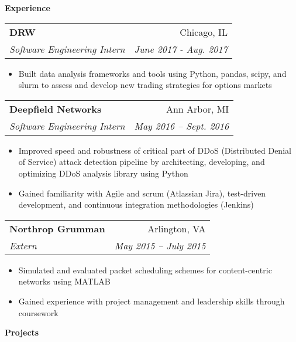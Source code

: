 \documentclass[letterpaper,11pt]{article}
\makeatletter
\newcommand{\resitem}[1]{\item #1 \vspace{-2pt}}
\newcommand{\resheading}[1]{{\large \colorbox{mygrey}{\begin{minipage}{\textwidth}{\textbf{#1 \vphantom{p\^{E}}}}\end{minipage}}}}
\newcommand{\ressubheading}[4]{
\begin{tabular*}{6.875in}{l@{\extracolsep{\fill}}r}
		\textbf{#1} & #2 \\
		\textit{#3} & \textit{#4} \\
\end{tabular*}\vspace{-6pt}}
\renewcommand{\footnotesize}{\fontsize{10pt}{11pt}\selectfont}
\makeatother
\begin{document}
		\resheading{Experience}
		\begin{description}
					\item 
			\ressubheading{DRW}{Chicago, IL}
			{Software Engineering Intern}{June 2017 - Aug. 2017}
			{	
				\footnotesize
				\begin{itemize}
					\resitem{Built data analysis frameworks and tools using Python, pandas, scipy, and slurm to assess and develop new trading strategies for options markets}
				\end{itemize}
			}
			\item 
			\ressubheading{Deepfield Networks}{Ann Arbor, MI}
			{Software Engineering Intern}{May 2016 -- Sept. 2016}
			{	
				\footnotesize
				\begin{itemize}
					\resitem{Improved speed and robustness of critical part of DDoS (Distributed Denial of Service) attack detection pipeline by architecting, developing, and optimizing DDoS analysis library using Python}
					\resitem{Gained familiarity with Agile and scrum (Atlassian Jira), test-driven development, and continuous integration methodologies (Jenkins)}
				\end{itemize}
			}
			\item 
			\ressubheading{Northrop Grumman}{Arlington, VA}
			{Extern}{May 2015 -- July 2015}
			{	
				\footnotesize
				\begin{itemize}
					\resitem{Simulated and evaluated packet scheduling schemes for content-centric networks using MATLAB}
					\resitem{Gained experience with project management and leadership skills through coursework}
				\end{itemize}
			}
			

			
		\end{description}  %
		
		\resheading{Projects}
		
\end{document}

